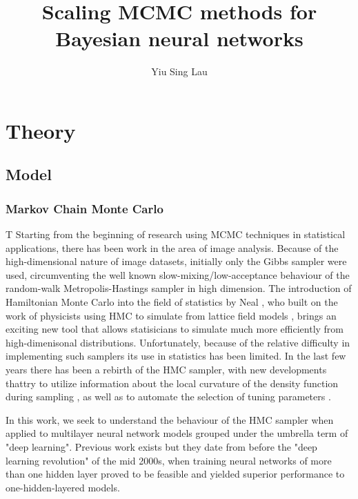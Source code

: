 \documentclass{book}
\title{Scaling MCMC methods for Bayesian neural networks}
\author{Yiu Sing Lau}
\date{}
\begin{document}
\maketitle
\tableofcontents 
\part{Theory}
 
\chapter{Model}

\section{Markov Chain Monte Carlo}
T
Starting from the beginning of research using MCMC techniques in statistical applications, there has been work \cite{geman1984stochastic,besag1986statistical} in the area of image analysis. Because of the high-dimensional nature of image datasets, initially only the Gibbs sampler were used, circumventing the well known slow-mixing/low-acceptance behaviour of the random-walk Metropolis-Hastings sampler in high dimension. The introduction of Hamiltonian Monte Carlo into the field of statistics by Neal \cite{neal2011mcmc,neal2012bayesian}, who built on the work of physicists using HMC to simulate from lattice field models \cite{duane1987hybrid}, brings an exciting new tool that allows statisicians to simulate much more efficiently from high-dimenisonal distributions. Unfortunately, because of the relative difficulty in implementing such samplers its use in statistics has been limited. In the last few years there has been a rebirth of the HMC sampler, with new developments thattry to utilize information about the local curvature of the density function during  sampling \cite{girolami2011riemann,betancourt2013general}, as well as to automate the selection of tuning parameters \cite{hoffman2014no,betancourt2016identifying}. 

In this work, we seek to understand the behaviour of the HMC sampler when applied to multilayer neural network models grouped under the umbrella term of "deep learning"\cite{schmidhuber2015deep}. Previous work exists \cite{choo2000learning,neal2012bayesian} but they date from before the "deep learning revolution" of the mid 2000s, when training neural networks of more than one hidden layer proved to be feasible and yielded superior performance to one-hidden-layered models.  
\end{document}
